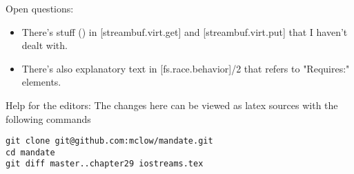 Open questions:
\begin{itemize}
\item{There's stuff (\requires) in [streambuf.virt.get] and [streambuf.virt.put] that I haven't dealt with.}
\item{There's also explanatory text in [fs.race.behavior]/2 that refers to "Requires:" elements.}
\end{itemize}



\vfill
Help for the editors: The changes here can be viewed as latex sources with the following commands
\begin{verbatim}
git clone git@github.com:mclow/mandate.git
cd mandate
git diff master..chapter29 iostreams.tex
\end{verbatim}
